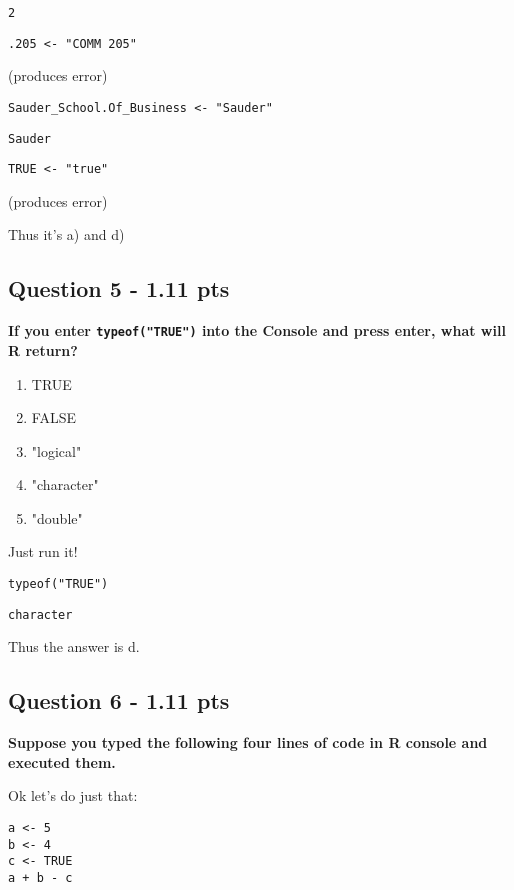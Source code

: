 \documentclass[11pt]{article}
\begin{document}
\begin{verbatim}
2
\end{verbatim}

\begin{verbatim}
.205 <- "COMM 205"
\end{verbatim}

(produces error)

\begin{verbatim}
Sauder_School.Of_Business <- "Sauder"
\end{verbatim}

\begin{verbatim}
Sauder
\end{verbatim}


\begin{verbatim}
TRUE <- "true"
\end{verbatim}

(produces error)

Thus it's a) and d)
\subsection*{Question 5 - 1.11 pts}
\label{sec:org827032d}
\textbf{If you enter \texttt{typeof("TRUE")} into the Console and press enter, what will R return?}
\begin{enumerate}
\item TRUE
\item FALSE
\item "logical"
\item "character"
\item "double"
\end{enumerate}


Just run it!

\begin{verbatim}
typeof("TRUE")
\end{verbatim}

\begin{verbatim}
character
\end{verbatim}


Thus the answer is d.
\subsection*{Question 6 - 1.11 pts}
\label{sec:org02dab05}

\textbf{Suppose you typed the following four lines of code in R console and executed them.}

Ok let's do just that: 
\begin{verbatim}
a <- 5
b <- 4
c <- TRUE
a + b - c
\end{verbatim}
\end{document}
